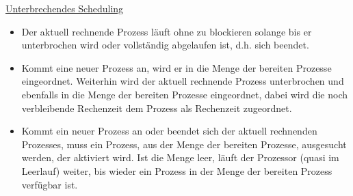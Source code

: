 \documentclass{uebungsblatt}
\begin{document}
\medskip
\underline{Unterbrechendes Scheduling}

\begin{itemize}
\item
Der aktuell rechnende Prozess läuft ohne zu blockieren solange bis er 
unterbrochen wird
oder vollständig abgelaufen ist, d.h. sich beendet.
\item
Kommt eine neuer Prozess an, wird er in die Menge der bereiten Prozesse 
eingeordnet. Weiterhin wird der aktuell rechnende Prozess unterbrochen 
und ebenfalls in die Menge der bereiten Prozesse eingeordnet, dabei wird die noch
verbleibende Rechenzeit dem Prozess als Rechenzeit zugeordnet.
\item
Kommt ein neuer Prozess an oder beendet sich der aktuell rechnenden Prozesses,
muss ein Prozess, aus der Menge der bereiten Prozesse, ausgesucht werden, 
der aktiviert wird.
Ist die Menge leer, läuft der Prozessor (quasi im Leerlauf) weiter,
bis wieder ein Prozess in der Menge der bereiten Prozess verfügbar ist.
\end{itemize}

\newpage
\end{document}
